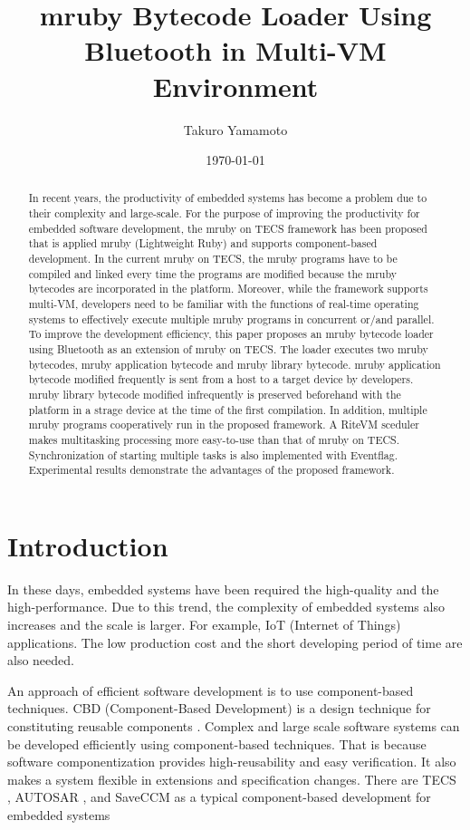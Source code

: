 \documentclass[conference,compsoc]{IEEEtran}
\title{mruby Bytecode Loader Using Bluetooth in Multi-VM Environment}
\author{Takuro Yamamoto}
\date{\today}
\begin{document}
\maketitle
\begin{abstract}
In recent years, the productivity of embedded systems has become a problem due to their complexity and large-scale.
For the purpose of improving the productivity for embedded software development, the mruby on TECS framework has been proposed that is applied mruby (Lightweight Ruby) and supports component-based development.
In the current mruby on TECS, the mruby programs have to be compiled and linked every time the programs are modified because the mruby bytecodes are incorporated in the platform.
Moreover, while the framework supports multi-VM, developers need to be familiar with the functions of real-time operating systems to effectively execute multiple mruby programs in concurrent or/and parallel.
To improve the development efficiency, this paper proposes an mruby bytecode loader using Bluetooth as an extension of mruby on TECS.
The loader executes two mruby bytecodes, mruby application bytecode and mruby library bytecode.
mruby application bytecode modified frequently is sent from a host to a target device by developers.
mruby library bytecode modified infrequently is preserved beforehand with the platform in a strage device at the time of the first compilation.
In addition, multiple mruby programs cooperatively run in the proposed framework.
A RiteVM sceduler makes multitasking processing more easy-to-use than that of mruby on TECS.
Synchronization of starting multiple tasks is also implemented with Eventflag. 
Experimental results demonstrate the advantages of the proposed framework.
\end{abstract}
\section{Introduction}
In these days, embedded systems have been required the high-quality and the high-performance.
Due to this trend, the complexity of embedded systems also increases and the scale is larger.
For example, IoT (Internet of Things) applications.
The low production cost and the short developing period of time are also needed.

An approach of efficient software development is to use component-based techniques.
CBD (Component-Based Development) is a design technique for constituting reusable components \cite{par:Crnkovic}.
Complex and large scale software systems can be developed efficiently using component-based techniques.
That is because software componentization provides high-reusability and easy verification.
It also makes a system flexible in extensions and specification changes.
There are TECS \cite{par:TECS}, AUTOSAR \cite{url:AUTOSAR}, and SaveCCM \cite{par:SAVEapproach} as a typical component-based development for embedded systems 
\end{document}
